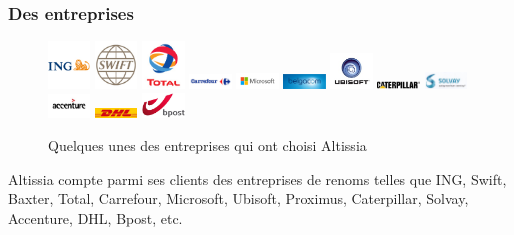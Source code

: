 \subsubsection{Des entreprises}
\begin{figure}[ht]
    \centering
    \includegraphics[width=0.1\textwidth]{images/companies/ing-logo.jpeg}
    \includegraphics[width=0.1\textwidth]{images/companies/swift-logo.jpeg}
    \includegraphics[width=0.1\textwidth]{images/companies/total-logo.jpeg}
    \includegraphics[width=0.1\textwidth]{images/companies/carrefour-logo.jpeg}
    \includegraphics[width=0.1\textwidth]{images/companies/microsoft-logo.png}
    \includegraphics[width=0.1\textwidth]{images/companies/belgacom-logo.jpeg}
    \includegraphics[width=0.1\textwidth]{images/companies/ubisoft-logo.jpeg}
    \includegraphics[width=0.1\textwidth]{images/companies/caterpillar-logo.jpeg}
    \includegraphics[width=0.1\textwidth]{images/companies/solvay-logo.jpeg}
    \includegraphics[width=0.1\textwidth]{images/companies/accenture-logo.jpeg}
    \includegraphics[width=0.1\textwidth]{images/companies/dhl-logo.jpeg}
    \includegraphics[width=0.1\textwidth]{images/companies/bpost-logo.jpeg}
    \caption{Quelques unes des entreprises qui ont choisi Altissia}
    \label{fig:companies-logo}
\end{figure}
Altissia compte parmi ses clients des entreprises de renoms telles que ING, Swift, Baxter, Total, Carrefour, Microsoft, Ubisoft, Proximus, Caterpillar, Solvay, Accenture, DHL, Bpost, etc.

